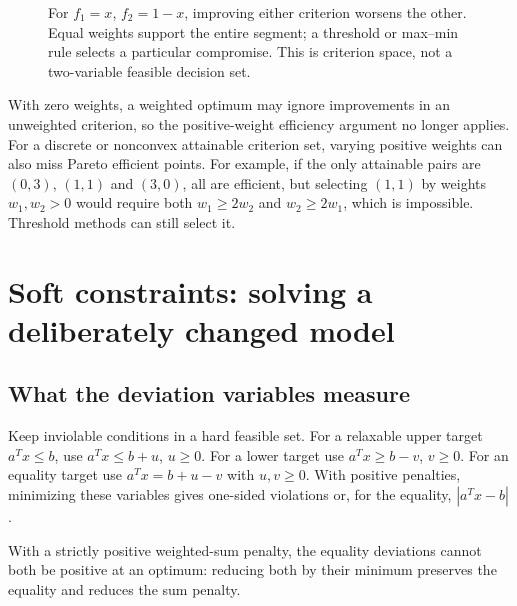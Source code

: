 \documentclass[11pt,a4paper]{article}
\begin{document}
\begin{figure}[H]
  \centering
  \caption{For $f_1=x$, $f_2=1-x$, improving either criterion worsens the other.
    Equal weights support the entire segment; a threshold or max--min rule
    selects a particular compromise. This is criterion space, not a two-variable
    feasible decision set.}\label{fig:pareto-tradeoff}
\end{figure}

With zero weights, a weighted optimum may ignore improvements in an unweighted
criterion, so the positive-weight efficiency argument no longer applies.
For a discrete or nonconvex attainable criterion set, varying positive weights
can also miss Pareto efficient points. For example, if the only attainable
pairs are $(0,3)$, $(1,1)$ and $(3,0)$, all are efficient, but selecting $(1,1)$
by weights $w_1,w_2>0$ would require both $w_1\geq2w_2$ and $w_2\geq2w_1$,
which is impossible. Threshold methods can still select it.

\section{Soft constraints: solving a deliberately changed model}\label{sec:goals}
\subsection{What the deviation variables measure}
\begin{lecturecore}
  Keep inviolable conditions in a hard feasible set. For a relaxable upper target
  $a^Tx\leq b$, use $a^Tx\leq b+u$, $u\geq0$. For a lower target use
  $a^Tx\geq b-v$, $v\geq0$. For an equality target use
  $a^Tx=b+u-v$ with $u,v\geq0$. With positive penalties, minimizing these
  variables gives one-sided violations or, for the equality, $|a^Tx-b|$.
\end{lecturecore}
With a strictly positive weighted-sum penalty, the equality deviations cannot
both be positive at an optimum: reducing both
by their minimum preserves the equality and reduces the sum penalty.
\end{document}
